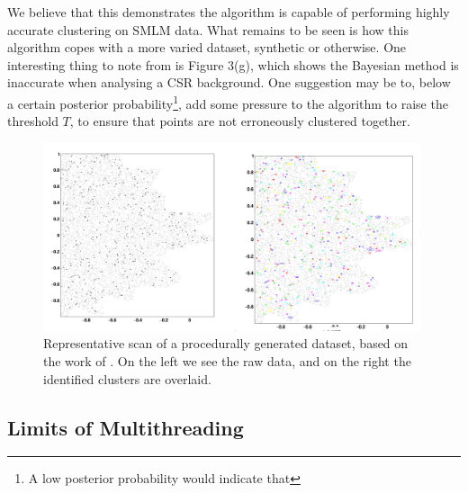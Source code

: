 \documentclass[11pt]{article}
\begin{document}
We believe that this demonstrates the algorithm is capable of performing highly accurate clustering on SMLM data. What remains to be seen is how this algorithm copes with a more varied dataset, synthetic or otherwise. One interesting thing to note from \cite{williamson2020machine} is Figure 3(g), which shows the Bayesian method is inaccurate when analysing a CSR background. One suggestion may be to, below a certain posterior probability\footnote{A low posterior probability would indicate that }, add some pressure to the algorithm to raise the threshold $T$, to ensure that points are not erroneously clustered together.\\




\begin{figure}
\centering
\includegraphics[width=0.99\textwidth]{figs/syntheticFig.png}
\caption{Representative scan of a procedurally generated dataset, based on the work of \cite{williamson2020machine}. On the left we see the raw data, and on the right the identified clusters are overlaid.}
\label{syntheticFig}
\end{figure}


\subsection{Limits of Multithreading}
\label{amdahlLlimit}
\end{document}
